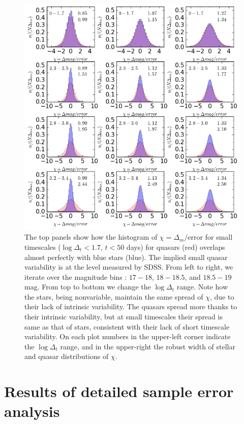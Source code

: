 \documentclass[fleqn,usenatbib]{mnras}  %
\begin{document}
\begin{figure}
\label{fig:histograms}
\includegraphics[width=1.1\columnwidth]{Fig_3_histogram_panels_NEW.png}
 \caption{The top panels show how the histogram of  $\chi = \Delta_{m}/ \mathrm{error}$ for small 
timescales ($\log{\Delta_{t}} < 1.7$, $t<50$ days) for  quasars (red) overlaps almost perfectly with blue stars (blue). The  implied small quasar variability is at the level  measured by SDSS.  From left to right, we iterate over the  magnitude bins :  $17-18$,  $18-18.5$, and $18.5-19$ mag. From top to bottom we change the  $\log{\Delta_{t}}$  range. Note how  the  stars, being nonvariable, maintain the same spread of $\chi$, due to their lack of intrinsic variability. The quasars spread more thanks to their intrinsic variability, but at small timescales their spread is same as that of stars, consistent with their lack of short timescale variability. On each plot numbers in the upper-left corner indicate the $\log{\Delta_{t}}$ range, and in the upper-right the robust width of stellar and quasar distributions of $\chi$. }
\end{figure}

\section{Results of detailed sample error analysis}
\label{sec:err_analysis}
\end{document}
